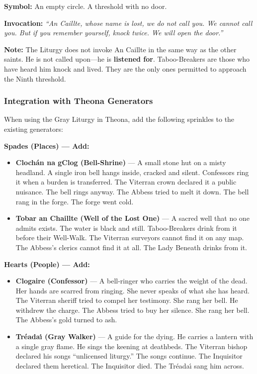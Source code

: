 \textbf{Symbol:} An empty circle. A threshold with no door.

\textbf{Invocation:} \textit{``An Caillte, whose name is lost, we do not call you. We cannot call you. But if you remember yourself, knock twice. We will open the door.''}

\textbf{Note:} The Liturgy does not invoke An Caillte in the same way as the other saints. He is not called upon---he is \textbf{listened for}. Taboo-Breakers are those who have heard him knock and lived. They are the only ones permitted to approach the Ninth threshold.

\subsubsection*{Integration with Theona Generators}

When using the Gray Liturgy in Theona, add the following sprinkles to the existing generators:

\textbf{Spades (Places) --- Add:}
\begin{itemize}
\item \textbf{Cloch\'an na gClog (Bell-Shrine)} --- A small stone hut on a misty headland. A single iron bell hangs inside, cracked and silent. Confessors ring it when a burden is transferred. The Viterran crown declared it a public nuisance. The bell rings anyway. The Abbess tried to melt it down. The bell rang in the forge. The forge went cold.
\item \textbf{Tobar an Chaillte (Well of the Lost One)} --- A sacred well that no one admits exists. The water is black and still. Taboo-Breakers drink from it before their Well-Walk. The Viterran surveyors cannot find it on any map. The Abbess's clerics cannot find it at all. The Lady Beneath drinks from it.
\end{itemize}

\textbf{Hearts (People) --- Add:}
\begin{itemize}
\item \textbf{Clogaire (Confessor)} --- A bell-ringer who carries the weight of the dead. Her hands are scarred from ringing. She never speaks of what she has heard. The Viterran sheriff tried to compel her testimony. She rang her bell. He withdrew the charge. The Abbess tried to buy her silence. She rang her bell. The Abbess's gold turned to ash.
\item \textbf{Tr\'eada\'{\i} (Gray Walker)} --- A guide for the dying. He carries a lantern with a single gray flame. He sings the keening at deathbeds. The Viterran bishop declared his songs ``unlicensed liturgy.'' The songs continue. The Inquisitor declared them heretical. The Inquisitor died. The Tr\'eada\'{\i} sang him across.
\end{itemize}

